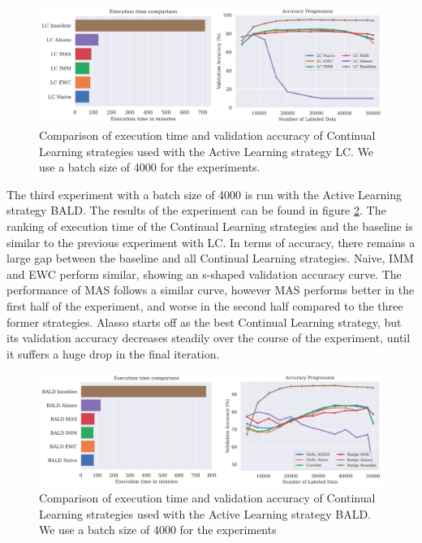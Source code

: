\begin{figure}[h]
    \centering
    \includegraphics[width=\linewidth]{images/results_CAL/LC_CAL_4000b.png}
    \caption[Continual Active Learning LC 4000 batch size]{Comparison of execution time and validation accuracy of Continual Learning strategies used with the Active Learning strategy
    LC. We use a batch size of 4000 for the experiments. }
    \label{fig:Evaluation:Results:CAL:LC4000}
\end{figure}

The third experiment with a batch size of 4000 is run with the Active Learning strategy BALD. The results of the experiment can be found in figure \ref{fig:Evaluation:Results:CAL:BALD4000}. The ranking of execution time of the Continual
Learning strategies and the baseline is similar to the previous experiment with LC. In terms of accuracy, there remains a large gap between the baseline and all Continual Learning strategies. Naive, IMM and EWC perform similar, showing an
s-shaped validation accuracy curve. The performance of MAS follows a similar curve, however MAS performs better in the first half of the experiment, and worse in the second half compared to the three former strategies. Alasso starts off as
the best Continual Learning strategy, but its validation accuracy decreases steadily over the course of the experiment, until it suffers a huge drop in the final iteration. \par 

\begin{figure}[h]
    \centering
    \includegraphics[width=\linewidth]{images/results_CAL/Bald_CAL_4000b.png}
    \caption[Continual Active Learning BALD 4000 batch size]{Comparison of execution time and validation accuracy of Continual Learning strategies used with the Active Learning strategy
    BALD. We use a batch size of 4000 for the experiments }
    \label{fig:Evaluation:Results:CAL:BALD4000}
\end{figure}


